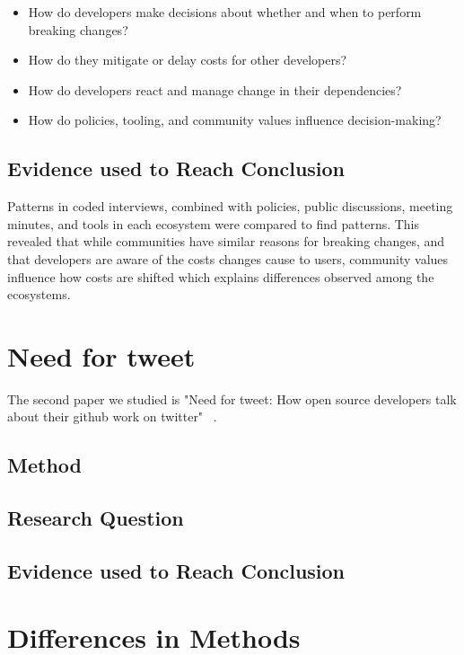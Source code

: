 \documentclass[conference]{IEEEtran}
\begin{document}
\begin{itemize}
    \item How do developers make decisions about whether and when to perform breaking changes?
    \item How do they mitigate or delay costs for other developers?
    \item How do developers react and manage change in their dependencies?
    \item How do policies, tooling, and community values influence decision-making?
\end{itemize}

\subsection{Evidence used to Reach Conclusion}

Patterns in coded interviews, combined with policies, public discussions, meeting minutes, and tools in each ecosystem were compared to find patterns.
This revealed that while communities have similar reasons for breaking changes, and that developers are aware of the costs changes cause to users, community values influence how costs are shifted which explains differences observed among the ecosystems.

\section{Need for tweet}
The second paper we studied is "Need for tweet: How open source developers talk about their github work on twitter"~\cite{fang2020need} .

\subsection{Method}

\subsection{Research Question}

\subsection{Evidence used to Reach Conclusion}

\section{Differences in Methods}
\end{document}
